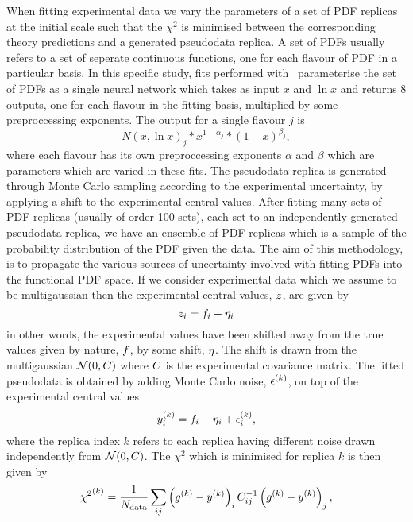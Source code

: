 When fitting experimental data we vary the parameters of a set of PDF replicas
at the initial scale such that the $\chi^2$ is minimised between the
corresponding theory predictions and a generated pseudodata replica. A set of
PDFs usually refers to a set of seperate continuous functions, one for each
flavour of PDF in a particular basis. In this specific study, fits performed
with \nfit\ parameterise the set of PDFs as a single neural network which takes
as input $x$ and $\ln x$ and returns 8 outputs, one for each flavour in the
fitting basis, multiplied by some preproccessing exponents. The output for a
single flavour $j$ is
\begin{equation}
    N(x, \ln x)_j * x^{1-\alpha_j} * (1-x)^{\beta_j},
\end{equation}
where each flavour has its own preproccessing exponents $\alpha$ and $\beta$
which are parameters which are varied in these fits. The pseudodata replica is
generated through Monte Carlo sampling according to the experimental
uncertainty, by applying a shift to the experimental central values. After
fitting many sets of PDF replicas (usually of order 100 sets), each set to an
independently generated pseudodata replica, we have an ensemble of PDF replicas
which is a sample of the probability distribution of the PDF given the data. The
aim of this methodology, is to propagate the various sources of uncertainty
involved with fitting PDFs into the functional PDF space. If we consider
experimental data which we assume to be multigaussian then the experimental
central values, $z$, are given by
\begin{equation}
    z_{i} = f_i + \eta_i
\end{equation}
in other words, the experimental values have been shifted away from the true
values given by nature, $f$, by some shift, $\eta$. The shift is drawn from
the multigaussian $\mathcal{N}(0, C)$ where $C$ is the experimental
covariance matrix. The fitted pseudodata is obtained by adding Monte Carlo
noise, $\epsilon^{(k)}$, on top of the experimental central values
\begin{equation}
    y^{(k)}_{i} = f_i + \eta_i + \epsilon^{(k)}_{i},
\end{equation}
where the replica index $k$ refers to each replica having different noise drawn
independently from $\mathcal{N}(0, C)$. The $\chi^2$ which is minimised for
replica $k$ is then given by
\begin{equation}
    {\chi^2}^{(k)} = \frac{1}{N_{\rm data}} \sum_{ij} \left( g^{(k)} - y^{(k)} \right)_i C^{-1}_{ij} \left( g^{(k)} - y^{(k)} \right)_j,
\end{equation}
